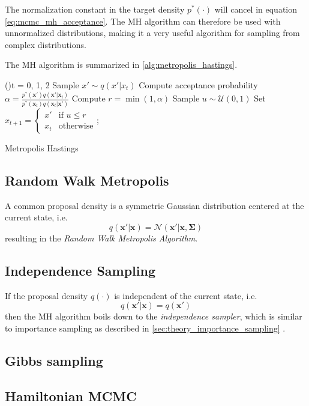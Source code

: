 The normalization constant in the target density $p^*(\cdot)$ will cancel in equation \eqref{eq:mcmc_mh_acceptance}. The MH algorithm can therefore be used with unnormalized distributions, making it a very useful algorithm for sampling from complex distributions. 

The MH algorithm is summarized in \cref{alg:metropolis_hastings}.
\begin{algorithm}
\SetAlgoLined
\For(){t = 0, 1, 2}{
    Sample $x' \sim q(x' | x_t)$ \;
    Compute acceptance probability \\
    $\alpha = \frac{p^*(\mathbf{x'}) q(\mathbf{x'} | \mathbf{x}_t)}{p^*(\mathbf{x}_t) q(\mathbf{x}_t | \mathbf{x'})}$\;
    Compute $r = \min(1, \alpha)$\;
    Sample $u \sim \mathcal{U}(0, 1)$\;
    Set $x_{t+1} = \begin{cases}x' & \text{if } u \leq r\\x_t & \text{otherwise}\end{cases}$;
}
\caption{Metropolis Hastings}
\label{alg:metropolis_hastings}
\end{algorithm}

\subsection{Random Walk Metropolis}\label{sec:random_walk_metropolis}
A common proposal density is a symmetric Gaussian distribution centered at the current state, i.e. $$q(\mathbf{x'} | \mathbf{x}) = \mathcal{N}(\mathbf{x'} | \mathbf{x}, \boldsymbol{\Sigma})$$ resulting in the \textit{Random Walk Metropolis Algorithm}.

\subsection{Independence Sampling}
If the proposal density $q(\cdot)$ is independent of the current state, i.e. $$q(\mathbf{x'} | \mathbf{x}) = q(\mathbf{x'})$$ then the MH algorithm boils down to the \textit{independence sampler}, which is similar to importance sampling as described in \cref{sec:theory_importance_sampling} \cite{murphy}.

\subsection{Gibbs sampling}

\subsection{Hamiltonian MCMC}

